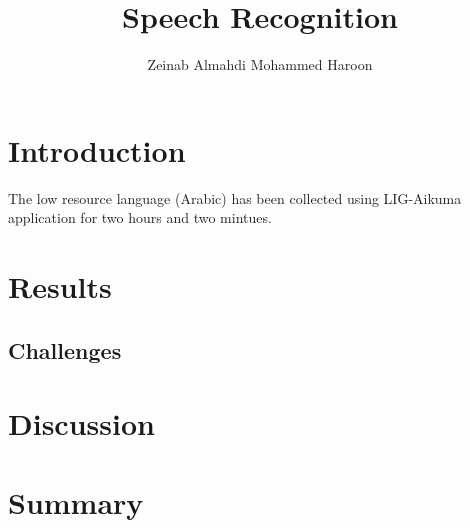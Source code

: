 \documentclass[10pt,a4paper]{article}
\title{\textbf{Speech Recognition}}
\author{Zeinab Almahdi Mohammed Haroon}
\begin{document}
	\maketitle
	\newpage
	\section{Introduction}
	The low resource language (Arabic) has been collected using LIG-Aikuma application for two hours and two mintues. 
	
	\section{Results}
	\subsection{Challenges}
	\section {Discussion}
	\section{Summary}
	
\end{document}
